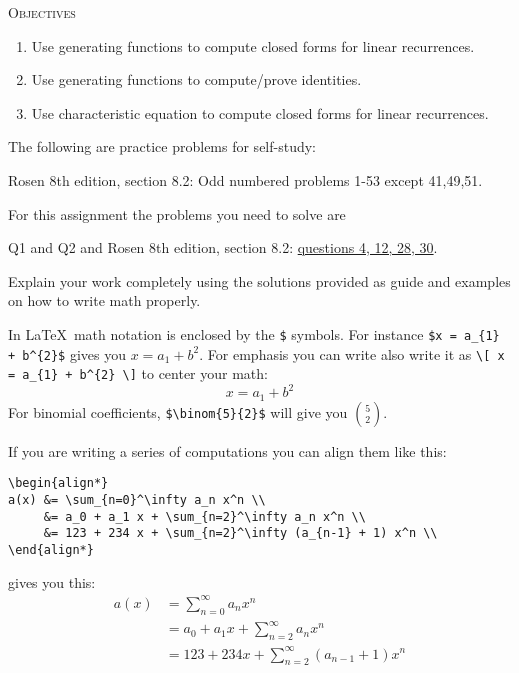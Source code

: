 

\renewcommand\AUTHOR{jdoe5@cougars.ccis.edu} %


\topmattertwo

\textsc{Objectives}
\begin{enumerate}[nosep]
\item Use generating functions to compute closed forms for linear recurrences.
\item Use generating functions to compute/prove identities.
\item Use characteristic equation to compute closed forms for
linear recurrences.
\end{enumerate}
\vspace{1cm}



The following are practice problems for self-study:
\begin{enumerate}[nosep]
\li Rosen 8th edition, section 8.2: Odd numbered problems 1-53 except 41,49,51.
\end{enumerate}
For this assignment the problems you need to solve are
\begin{enumerate}[nosep]
\li Q1 and Q2 and 
\li Rosen 8th edition, section 8.2:
\underline{questions 4, 12, 28, 30}.
\end{enumerate}
Explain your work completely using the solutions provided as
guide and examples on how to write math properly.

In \LaTeX\, math notation is enclosed by the \verb!$! symbols.
For instance \verb!$x = a_{1} + b^{2}$! gives you $x = a_{1} + b^{2}$.
For emphasis you can write also write it as
\verb!\[ x = a_{1} + b^{2} \]!
to center your math:
\[
x = a_{1} + b^{2}
\]
For binomial coefficients, \verb!$\binom{5}{2}$! will give you 
$\binom{5}{2}$.

If you are writing a series of computations you can align them like this:
\begin{Verbatim}[frame=single,fontsize=\footnotesize]
\begin{align*}
a(x) &= \sum_{n=0}^\infty a_n x^n \\
     &= a_0 + a_1 x + \sum_{n=2}^\infty a_n x^n \\
     &= 123 + 234 x + \sum_{n=2}^\infty (a_{n-1} + 1) x^n \\
\end{align*}
\end{Verbatim}
gives you this:
\begin{align*}
a(x) &= \sum_{n=0}^\infty a_n x^n \\
     &= a_0 + a_1 x + \sum_{n=2}^\infty a_n x^n \\
     &= 123 + 234 x + \sum_{n=2}^\infty (a_{n-1} + 1) x^n \\
\end{align*}

